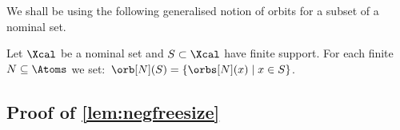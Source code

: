 We shall be using the following generalised notion of orbits for a subset of a nominal set.

\begin{definition}
  Let $\Xcal$ be a nominal set and $S\subset\Xcal$ have finite support. For each finite $N\subseteq\Atoms$ we set:\
$
\orb[N](S) = \{ \orbs[N](x)\mid x\in S\} 
$.
\end{definition}

\subsection{Proof of \cref{lem:negfreesize}}
\negfreesize*


